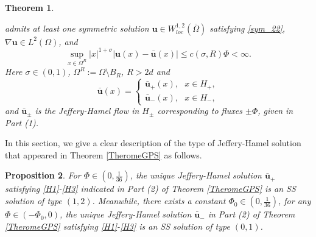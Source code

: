 \documentclass[reqno,12pt]{amsart}
\newtheorem{theorem}{Theorem}[section]
\newtheorem{pro}[theorem]{Proposition}
\newcommand{\Bu}{{\boldsymbol{u}}}
\begin{document}
\begin{theorem}
\begin{enumerate}[(1)]
    admits at least one symmetric solution  $\Bu \in W_{loc}^{1, 2}(\overline{\Omega})$ satisfying \eqref{sym_22},  $\nabla \Bu\in L^2(\Omega)$, 
    and 
    \begin{equation*}
        \sup_{x\in \Omega^R} |x|^{1+\sigma} |\Bu(x) - \bar{\Bu}(x)| \leq  c(\sigma,R)\Phi <\infty. 
    \end{equation*}
    Here $\sigma \in (0,1)$, $\Omega^R:=\Omega \setminus B_R$, $R>2d$ and
    \begin{equation*}        
   \bar{\Bu}(x) = \left\{ \begin{array}{l} \bar{\Bu}_{+}(x), \ \ \ x\in H_+, \\
     \bar{\Bu}_{-}(x), \ \ \ x\in H_-, \end{array}
    \right. 
     \end{equation*}     
     and $\bar{\Bu}_{\pm}$ is the Jeffery-Hamel flow in $ H_{\pm}$ corresponding to  fluxes $\pm \Phi$, given  in Part (1).
\end{enumerate}
\end{theorem}


In this section, we give a clear description of the type of Jeffery-Hamel solution that appeared in Theorem \ref{TheromeGPS} as follows. 
\begin{pro}\label{Prophalfplane}
  For $\Phi \in (0, \frac{1}{36})$, the  unique Jeffery-Hamel solution $\bar{\Bu}_{+}$ satisfying \eqref{H1}-\eqref{H3} indicated in Part (2) of Theorem \ref{TheromeGPS} is an SS solution of type $(1, 2)$. Meanwhile, there exists a constant $\Phi_0 \in (0, \frac{1}{36})$, for any $\Phi \in (-\Phi_0, 0)$, the unique Jeffery-Hamel solution   $\bar{\Bu}_{-}$ in Part (2) of Theorem \ref{TheromeGPS} satisfying \eqref{H1}-\eqref{H3} is an SS solution of type $(0, 1)$. 
\end{pro}
\end{document}
